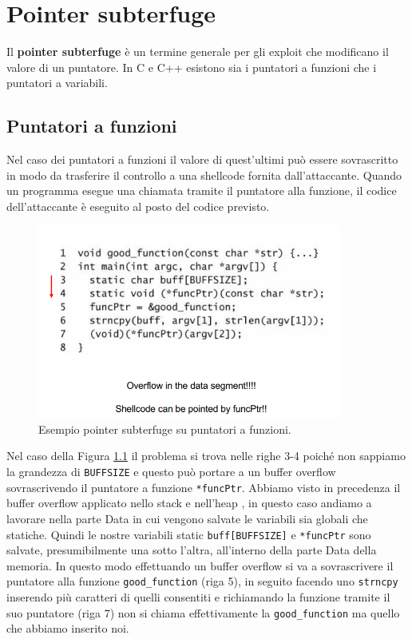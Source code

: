 \chapter{Pointer subterfuge}

Il \textbf{pointer subterfuge} è un termine generale per gli exploit che modificano
il valore di un puntatore. In C e C++ esistono sia i puntatori a funzioni che i
puntatori a variabili.

\section{Puntatori a funzioni}

Nel caso dei puntatori a funzioni il valore di quest'ultimi può essere sovrascritto
in modo da trasferire il controllo a una shellcode fornita dall'attaccante.
Quando un programma esegue una  chiamata tramite il puntatore alla funzione, il codice
dell'attaccante è eseguito al posto del codice previsto.

\begin{figure}[H]
	\centering
	\includegraphics[width=10cm, keepaspectratio]{capitoli/secure_coding/img/cap_5/es_pointer_sub.png}
	\caption{Esempio pointer subterfuge su puntatori a funzioni.}\label{fig:es_poin_sub}
\end{figure}

Nel caso della Figura \ref{fig:es_poin_sub} il problema si trova nelle righe 3-4 poiché
non sappiamo la grandezza di \verb|BUFFSIZE| e questo può portare a un buffer overflow
sovrascrivendo il puntatore a funzione \verb|*funcPtr|. Abbiamo visto in precedenza
il buffer overflow applicato nello stack e nell'heap , in questo caso andiamo a
lavorare nella parte Data in cui vengono salvate le variabili sia globali che statiche.
Quindi le nostre variabili static \verb|buff[BUFFSIZE]| e \verb|*funcPtr| sono salvate,
presumibilmente una sotto l'altra, all'interno della parte Data della memoria.
In questo modo effettuando un buffer overflow si va a sovrascrivere il puntatore alla
funzione \verb|good_function| (riga 5), in seguito facendo uno \verb|strncpy| inserendo
più caratteri di quelli consentiti e richiamando la funzione tramite il suo
puntatore (riga 7) non si chiama effettivamente la \verb|good_function| ma
quello che abbiamo inserito noi.

